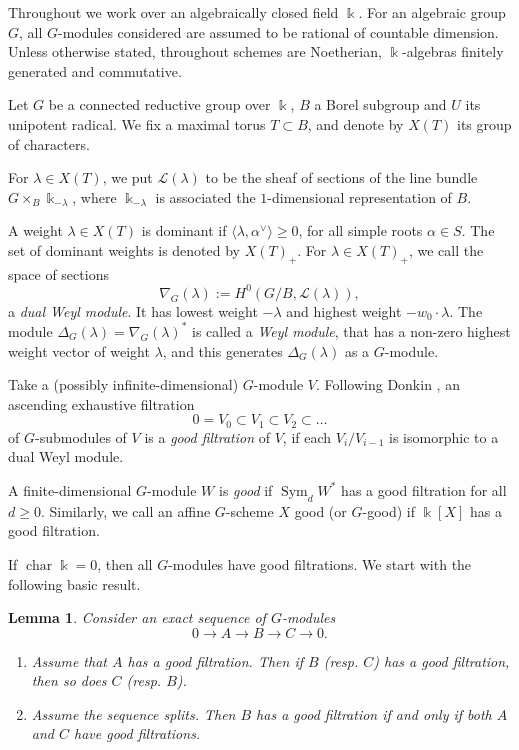 \documentclass[11pt]{amsart}
\numberwithin{equation}{section}
\newtheorem{lemma}[equation]{Lemma}
\theoremstyle{definition}
\DeclareMathOperator{\Sym}{Sym}
\DeclareMathOperator{\GL}{GL}
\DeclareMathOperator{\cha}{char}
\newcommand{\op}{\operatorname}
\newcommand{\la}{\lambda}
\newcommand{\al}{\alpha}
\newcommand{\mc}{\mathcal}
\newcommand{\kk}{\Bbbk}
\begin{document}
Throughout we work over an algebraically closed field $\kk$.  For an algebraic group $G$, all $G$-modules considered are assumed to be rational of countable dimension. Unless otherwise stated, throughout schemes are Noetherian, $\kk$-algebras finitely generated and commutative.



\medskip

Let $G$ be a connected reductive group over $\kk$, $B$ a Borel subgroup and $U$ its unipotent radical. We fix a maximal torus $T \subset B$, and denote by $X(T)$ its group of characters.

For $\la \in X(T)$, we put $\mc{L}(\la)$ to be the sheaf of sections of the line bundle $G\times_B \kk_{-\la}$, where $\kk_{-\la}$ is associated the $1$-dimensional representation of $B$.

A weight $\la \in X(T)$ is dominant if $\langle \la , \al^\vee \rangle \geq 0$, for all simple roots $\al \in S$. The set of dominant weights is denoted by $X(T)_+$. For $\la \in X(T)_+$, we call the space of sections
\[\nabla_G(\la):=H^0(G/B, \mc{L}(\la)),\]
a \emph{dual Weyl module}. It has lowest weight $-\la$ and highest weight $-w_0 \cdot \la$. The module $\Delta_G(\la) = \nabla_G(\la)^*$ is called a \emph{Weyl module}, that has a non-zero highest weight vector of weight $\la$, and this generates $\Delta_G(\la)$ as a $G$-module. 



Take a (possibly infinite-dimensional) $G$-module $V$. Following Donkin \cite{donkin}, an ascending exhaustive filtration 
\[0 = V_0 \subset V_1 \subset V_2 \subset \dots\]
of $G$-submodules of $V$ is a \textit{good filtration} of $V$, if each $V_i/V_{i-1}$ is isomorphic to a dual Weyl module. 

A finite-dimensional $G$-module $W$ is \textit{good} if $\Sym_d W^*$ has a good filtration for all $d\geq 0$.  Similarly, we call an affine $G$-scheme $X$ good (or $G$-good) if $\kk[X]$ has a good filtration. 

\smallskip

If $\cha \kk = 0$, then all $G$-modules have good filtrations. We start with the following basic result.

\begin{lemma}\label{lem:seq}
Consider an exact sequence of $G$-modules
\[ 0 \to A \to B \to C \to 0.\]
\begin{enumerate}
\item Assume that $A$ has a good filtration. Then if $B$ (resp. $C$) has a good filtration, then so does $C$ (resp. $B$).
\item Assume the sequence splits. Then $B$ has a good filtration if and only if both $A$ and $C$ have good filtrations.
\end{enumerate}
\end{lemma}
\end{document}
